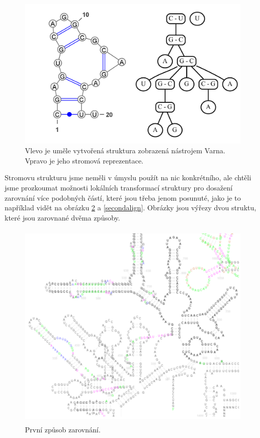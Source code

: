 \begin{figure}[H]
  \centering
  \includegraphics[width=130mm]{../img/kap02/tree/tree.png}
  \caption[Stromová reprezentace sekundární struktury RNA]{Vlevo je uměle
  vytvořená struktura zobrazená nástrojem Varna. Vpravo je jeho stromová
  reprezentace.}
  \label{treerep}
\end{figure}

Stromovu strukturu jsme neměli v úmyslu použít na nic konkrétního, ale chtěli
jsme prozkoumat možnosti lokálních transformací struktury pro dosažení
zarovnání více podobných částí, které jsou třeba jenom posunuté, jako je to
například vidět na obrázku \ref{firstalign} a \ref{secondalign}. Obrázky jsou
výřezy dvou struktu, které jsou zarovnané dvěma způsoby.

\begin{figure}[H]
  \centering
  \includegraphics[height=100mm]{../img/kap02/tree/align1.png}
  \caption[První způsob zarovnání]{První způsob zarovnání.}
  \label{firstalign}
\end{figure}

